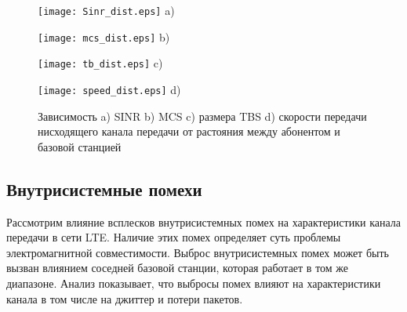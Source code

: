 \clearpage

\begin{figure} [!h]
\begin{minipage}[h]{0.47\linewidth}
\center
\texttt{[image: Sinr\_dist.eps]} a) \\
\end{minipage}
\hfill
\begin{minipage}[h]{0.47\linewidth}
\center
\texttt{[image: mcs\_dist.eps]} b) \\
\end{minipage}
\vfill
\begin{minipage}[h]{0.47\linewidth}
\center
\texttt{[image: tb\_dist.eps]} c) \\
\end{minipage}
\hfill
\begin{minipage}[h]{0.47\linewidth}
\center
\texttt{[image: speed\_dist.eps]} d) \\
\end{minipage}
\caption{Зависимость a) SINR b) MCS c) размера TBS d) скорости передачи нисходящего канала передачи от растояния между абонентом и базовой станцией}
\label{img:dist}
\end{figure}

\subsection{Внутрисистемные помехи}  \label{sect2_2_3}
Рассмотрим влияние всплесков внутрисистемных помех на характеристики канала передачи в сети LTE. Наличие этих помех определяет суть проблемы электромагнитной совместимости. Выброс внутрисистемных помех может быть вызван влиянием соседней базовой станции, которая работает в том же диапазоне.
Анализ показывает, что выбросы помех влияют на характеристики канала в том числе на джиттер и  потери пакетов.

